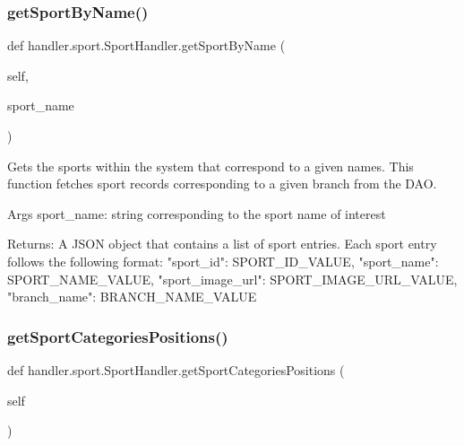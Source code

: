 \subsubsection{\texorpdfstring{get\+Sport\+By\+Name()}{getSportByName()}}
{\footnotesize\ttfamily def handler.\+sport.\+Sport\+Handler.\+get\+Sport\+By\+Name (\begin{DoxyParamCaption}\item[{}]{self,  }\item[{}]{sport\+\_\+name }\end{DoxyParamCaption})}

\begin{DoxyVerb}Gets the sports within the system that correspond to a given names.
This function fetches sport records corresponding to a given branch from the DAO.

Args
    sport_name: string corresponding to the sport name of interest

Returns:
    A JSON object that contains a list of sport entries.
    Each sport entry follows the following format:
{
    "sport_id": SPORT_ID_VALUE,
    "sport_name": SPORT_NAME_VALUE,
    "sport_image_url": SPORT_IMAGE_URL_VALUE,
    "branch_name": BRANCH_NAME_VALUE
}
\end{DoxyVerb}
 \mbox{\label{classhandler_1_1sport_1_1_sport_handler_ad83c6e5db6358cf97f46b04135100c53}} 
\subsubsection{\texorpdfstring{get\+Sport\+Categories\+Positions()}{getSportCategoriesPositions()}}
{\footnotesize\ttfamily def handler.\+sport.\+Sport\+Handler.\+get\+Sport\+Categories\+Positions (\begin{DoxyParamCaption}\item[{}]{self }\end{DoxyParamCaption})}

